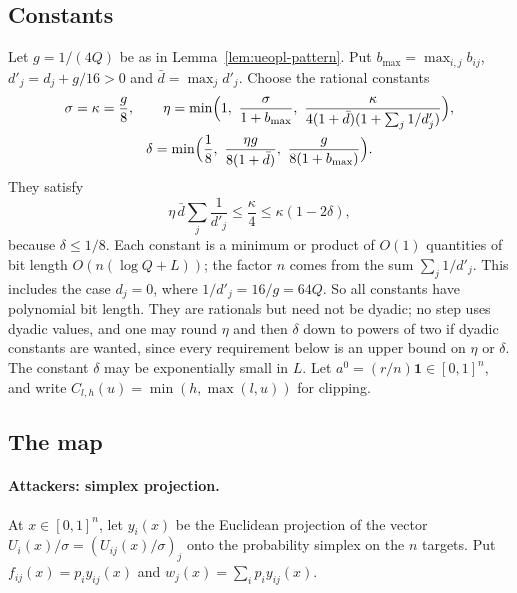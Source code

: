 \subsection{Constants}

Let $g=1/(4Q)$ be as in Lemma~\ref{lem:ueopl-pattern}. Put $b_{\max}=\max_{i,j}b_{ij}$,
$d'_j=d_j+g/16>0$ and $\bar d=\max_jd'_j$. Choose the rational constants
\begin{gather*}
  \sigma=\kappa=\frac g8,\qquad
  \eta=\min\Bigl(1,\ \frac{\sigma}{1+b_{\max}},\ \frac{\kappa}{4(1+\bar d)(1+\sum_j1/d'_j)}\Bigr),\\
  \delta=\min\Bigl(\frac18,\ \frac{\eta g}{8(1+\bar d)},\ \frac{g}{8(1+b_{\max})}\Bigr).
\end{gather*}
They satisfy
\begin{equation}\label{eq:ueopl-const}
  \eta\,\bar d\sum_j\frac1{d'_j}\le\frac\kappa4\le\kappa(1-2\delta),
\end{equation}
because $\delta\le1/8$. Each constant is a minimum or product of $O(1)$ quantities of bit length $O(n(\log Q+L))$; the factor $n$ comes from the sum $\sum_j1/d'_j$. This includes the case $d_j=0$, where $1/d'_j=16/g=64Q$. So all constants have
polynomial bit length. They are rationals but need not be dyadic; no step uses dyadic values, and one
may round $\eta$ and then $\delta$ down to powers of two if dyadic constants are wanted, since every
requirement below is an upper bound on $\eta$ or $\delta$. The constant $\delta$ may be exponentially
small in $L$. Let $a^0=(r/n)\mathbf 1\in[0,1]^n$, and write $C_{l,h}(u)=\min(h,\max(l,u))$ for clipping.

\subsection{The map}

\paragraph{Attackers: simplex projection.} At $x\in[0,1]^n$, let $y_i(x)$ be the Euclidean projection
of the vector $U_i(x)/\sigma=(U_{ij}(x)/\sigma)_j$ onto the probability simplex on the $n$ targets. Put
$f_{ij}(x)=p_iy_{ij}(x)$ and $w_j(x)=\sum_ip_iy_{ij}(x)$.

